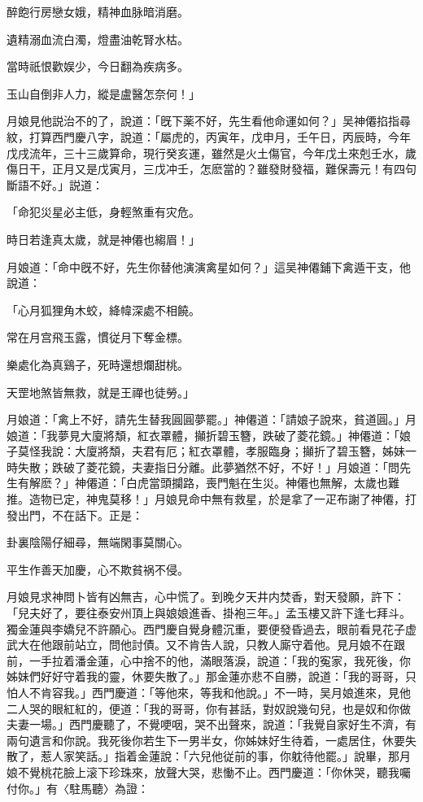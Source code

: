 \begin{myquote}
醉飽行房戀女娥，精神血脉暗消磨。

遺精溺血流白濁，燈盡油乾腎水枯。

當時祇恨歡娱少，今日翻為疾病多。

玉山自倒非人力，縱是盧醫怎奈何！」
\end{myquote}

月娘見他説治不的了，說道：「旣下薬不好，先生看他命運如何？」吴神僊掐指尋紋，打算西門慶八字，說道：「屬虎的，丙寅年，戊申月，壬午日，丙辰時，今年戊戌流年，三十三歲算命，現行癸亥運，雖然是火土傷官，今年戊土來剋壬水，歲傷日干，正月又是戊寅月，三戊冲壬，怎麽當的？雖發財發福，難保壽元！有四句斷語不好。」説道：

\begin{myquote}
「命犯災星必主低，身輕煞重有灾危。

時日若逢真太歲，就是神僊也縐眉！」
\end{myquote}

月娘道：「命中旣不好，先生你替他演演禽星如何？」這吴神僊鋪下禽遁干支，他說道：

\begin{myquote}
「心月狐狸角木蛟，絳幃深處不相饒。

常在月宫飛玉露，慣従月下奪金標。

樂處化為真鷄子，死時還想爛甜桃。

天罡地煞皆無救，就是王禪也徒勞。」
\end{myquote}

月娘道：「禽上不好，請先生替我圓圓夢罷。」神僊道：「請娘子說來，貧道圓。」月娘道：「我夢見大廈將頽，紅衣罩體，攧折碧玉簪，跌破了菱花鏡。」神僊道：「娘子莫怪我說：大廈將頽，夫君有厄；紅衣罩體，孝服臨身；攧折了碧玉簪，姊妹一時失散；跌破了菱花鏡，夫妻指日分離。此夢猶然不好，不好！」月娘道：「問先生有解麽？」神僊道：「白虎當頭攔路，喪門魁在生災。神僊也無解，太歲也難推。造物已定，神鬼莫移！」月娘見命中無有救星，於是拿了一疋布謝了神僊，打發出門，不在話下。正是：

\begin{myquote}
卦裏陰陽仔細尋，無端閑事莫關心。

平生作善天加慶，心不欺貧祸不侵。
\end{myquote}

月娘見求神問卜皆有凶無吉，心中慌了。到晚夕天井内焚香，對天發願，許下：「兒夫好了，要往泰安州頂上與娘娘進香、掛袍三年。」孟玉樓又許下逢七拜斗。獨金蓮與李嬌兒不許願心。西門慶自覺身體沉重，要便發昏過去，眼前看見花子虚武大在他跟前站立，問他討債。又不肯告人說，只教人廝守着他。見月娘不在跟前，一手拉着潘金蓮，心中捨不的他，滿眼落淚，說道：「我的寃家，我死後，你姊妹們好好守着我的靈，休要失散了。」那金蓮亦悲不自勝，說道：「我的哥哥，只怕人不肯容我。」西門慶道：「等他來，等我和他說。」不一時，吴月娘進來，見他二人哭的眼紅紅的，便道：「我的哥哥，你有甚話，對奴說幾句兒，也是奴和你做夫妻一場。」西門慶聽了，不覺哽咽，哭不出聲來，說道：「我覺自家好生不濟，有兩句遺言和你說。我死後你若生下一男半女，你姊妹好生待着，一處居住，休要失散了，惹人家笑話。」指着金蓮說：「六兒他従前的事，你躭待他罷。」說畢，那月娘不覺桃花臉上滚下珍珠來，放聲大哭，悲慟不止。西門慶道：「你休哭，聽我囑付你。」有〈駐馬聽〉為證：


